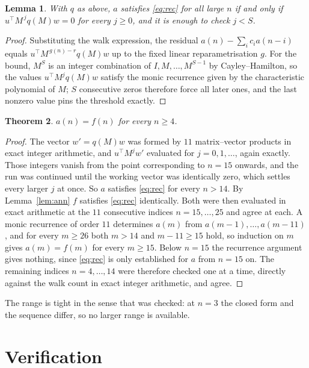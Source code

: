 \documentclass[11pt,a4paper]{article}
\theoremstyle{plain}
\newtheorem{theorem}{Theorem}
\newtheorem{lemma}[theorem]{Lemma}
\theoremstyle{definition}
\begin{document}
\begin{lemma}\label{lem:crit}
With $q$ as above, $a$ satisfies \eqref{eq:rec} for all large $n$ if and only if
$u^{\!\top}M^{\,j}q(M)w=0$ for every $j\ge0$, and it is enough to check $j<S$.
\end{lemma}

\begin{proof}
Substituting the walk expression, the residual $a(n)-\sum_ic_ia(n-i)$ equals
$u^{\!\top}M^{\,g(n)-r}q(M)w$ up to the fixed linear reparametrisation $g$. For the bound,
$M^{S}$ is an integer combination of $I,M,\dots,M^{S-1}$ by Cayley--Hamilton, so the values
$u^{\!\top}M^{j}q(M)w$ satisfy the monic recurrence given by the characteristic polynomial of
$M$; $S$ consecutive zeros therefore force all later ones, and the last nonzero value pins the
threshold exactly.
\end{proof}

\begin{theorem}
$a(n)=f(n)$ for every $n\ge4$.
\end{theorem}

\begin{proof}
The vector $w'=q(M)w$ was formed by $11$ matrix--vector products in exact integer
arithmetic, and $u^{\!\top}M^{j}w'$ evaluated for $j=0,1,\dots$, again exactly. Those integers
vanish from the point corresponding to $n=15$ onwards, and the run was continued until the
working vector was identically zero, which settles every larger $j$ at once. So $a$ satisfies
\eqref{eq:rec} for every $n>14$. By Lemma~\ref{lem:ann} $f$ satisfies \eqref{eq:rec}
identically. Both were then evaluated in exact arithmetic at the $11$ consecutive indices
$n=15,\dots,25$ and agree at each. A monic recurrence of order $11$
determines $a(m)$ from $a(m-1),\dots,a(m-11)$, and for every $m\ge26$ both
$m>14$ and $m-11\ge15$ hold, so induction on $m$ gives $a(m)=f(m)$ for every
$m\ge15$.
Below $n=15$ the recurrence argument gives nothing, since \eqref{eq:rec} is only
established for $a$ from $n=15$ on. The remaining indices $n=4,\dots,14$ were
therefore checked one at a time, directly against the walk count in exact integer arithmetic,
and agree.
\end{proof}

The range is tight in the sense that was checked: at $n=3$ the closed form and the sequence differ, so no larger range is available.

\section{Verification}
\end{document}
